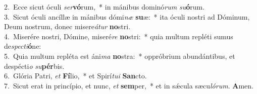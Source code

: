 {2.~}Ecce sicut óculi \textit{ser}\textbf{vó}rum,~* in mánibus dominó\textit{rum} \textit{su}\textbf{ó}rum.\\
{3.~}Sicut óculi ancíllæ in mánibus dómi\textit{næ} \textbf{su}æ:~* ita óculi nostri ad Dóminum, Deum nostrum, donec misere\textit{á}\textit{tur} \textbf{no}stri.\\
{4.~}Miserére nostri, Dómine, miseré\textit{re} \textbf{no}stri:~* quia multum repléti sumus de\textit{spe}\textit{cti}\textbf{ó}ne:\\
{5.~}Quia multum repléta est áni\textit{ma} \textbf{no}stra:~* oppróbrium abundántibus, et despécti\textit{o} \textit{su}\textbf{pér}bis.\\
{6.~}Glória Patri, \textit{et} \textbf{Fí}lio,~* et Spirí\textit{tu}\textit{i} \textbf{San}cto.\\
{7.~}Sicut erat in princípio, et nunc, \textit{et} \textbf{sem}per,~* et in sǽcula sæcu\textit{ló}\textit{rum}. \textbf{A}men.\\
